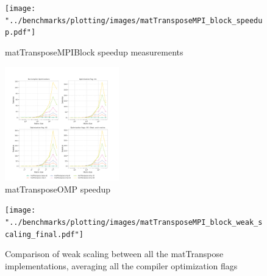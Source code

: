 \documentclass[conference]{IEEEtran}
\begin{document}
\begin{figure}[htb]
	\centering
	\texttt{[image: "../benchmarks/plotting/images/matTransposeMPI\_block\_speedup.pdf"]}
	\caption{matTransposeMPIBlock speedup measurements}
	\label{fig:transpose_mpi_block_speedup}
\end{figure}

\begin{figure}[htb]
	\centering
	\includegraphics[width=0.44\textwidth]{"../benchmarks/plotting/images/transpose_explicit_speedup.pdf"}
	\caption{matTransposeOMP speedup}
	\label{fig:transpose_mp_speedup}
\end{figure}

\begin{figure}[htb]
	\centering
	\texttt{[image: "../benchmarks/plotting/images/matTransposeMPI\_block\_weak\_scaling\_final.pdf"]}
	\caption{Comparison of weak scaling between all the matTranspose implementations, averaging all the compiler optimization flags}
	\label{fig:transpose_mpi_block_weak_scaling_final}
\end{figure}
\end{document}
